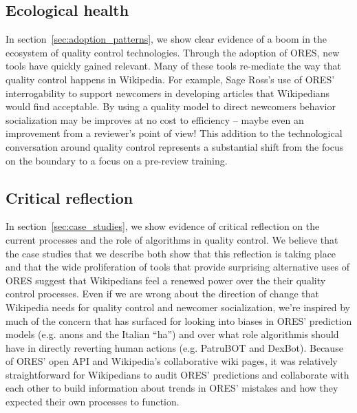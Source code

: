 \subsection{Ecological health}
In section~\ref{sec:adoption_patterns}, we show clear evidence of a boom in the ecosystem of quality control technologies.  Through the adoption of ORES, new tools have quickly gained relevant.  Many of these tools re-mediate the way that quality control happens in Wikipedia.  For example, Sage Ross's use of ORES' interrogability to support newcomers in developing articles that Wikipedians would find acceptable.  By using a quality model to direct newcomers behavior socialization may be improves at no cost to efficiency -- maybe even an improvement from a reviewer's point of view!  This addition to the technological conversation around quality control represents a substantial shift from the focus on the boundary\cite{geiger12socialization} to a focus on a pre-review training. 

\subsection{Critical reflection}
In section~\ref{sec:case_studies}, we show evidence of critical reflection on the current processes and the role of algorithms in quality control.  We believe that the case studies that we describe both show that this reflection is taking place and that the wide proliferation of tools that provide surprising alternative uses of ORES suggest that Wikipedians feel a renewed power over the their quality control processes.  Even if we are wrong about the direction of change that Wikipedia needs for quality control and newcomer socialization, we're inspired by much of the concern that has surfaced for looking into biases in ORES' prediction models (e.g. anons and the Italian ``ha'') and over what role algorithmis should have in directly reverting human actions (e.g. PatruBOT and DexBot).  Because of ORES' open API and Wikipedia's collaborative wiki pages, it was relatively straightforward for Wikipedians to audit ORES' predictions and collaborate with each other to build information about trends in ORES' mistakes and how they expected their own processes to function.

